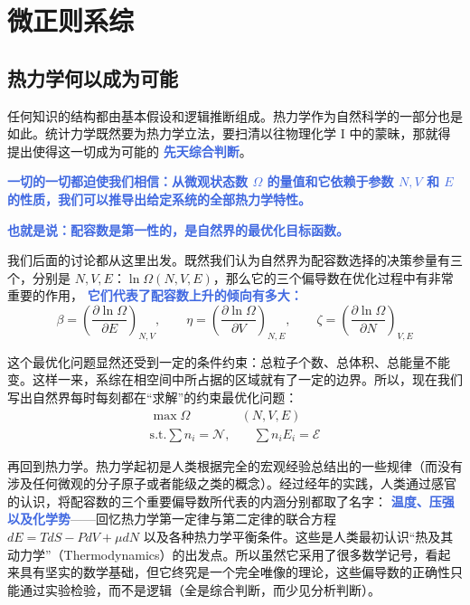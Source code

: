 \section{微正则系综}\label{sec:微正则系综}

\subsection{热力学何以成为可能}

任何知识的结构都由基本假设和逻辑推断组成。热力学作为自然科学的一部分也是如此。统计力学既然要为热力学立法，要扫清以往物理化学 I 中的蒙昧，那就得提出使得这一切成为可能的 \textcolor{RoyalBlue}{\textbf{\kaishu 先天综合判断}}。

\textcolor{RoyalBlue}{\textbf{\kaishu 一切的一切都迫使我们相信：从微观状态数 $\Omega$ 的量值和它依赖于参数 $N,V$ 和 $E$ 的性质，我们可以推导出给定系统的全部热力学特性。}}

\textcolor{RoyalBlue}{\textbf{\kaishu 也就是说：配容数是第一性的，是自然界的最优化目标函数。}}

我们后面的讨论都从这里出发。既然我们认为自然界为配容数选择的决策参量有三个，分别是 $N,V,E$：$\ln\Omega(N,V,E)$，那么它的三个偏导数在优化过程中有非常重要的作用， \textcolor{RoyalBlue}{\textbf{\kaishu 它们代表了配容数上升的倾向有多大：}} 
\begin{equation}
    \beta = \left(\frac{\partial \ln\Omega}{\partial E}\right)_{N,V},\quad\quad \eta = \left(\frac{\partial \ln\Omega}{\partial V}\right)_{N,E},\quad\quad \zeta = \left(\frac{\partial \ln\Omega}{\partial N}\right)_{V,E}
\end{equation}

这个最优化问题显然还受到一定的条件约束：总粒子个数、总体积、总能量不能变。这样一来，系综在相空间中所占据的区域就有了一定的边界。所以，现在我们写出自然界每时每刻都在“求解”的约束最优化问题：
\begin{equation}\label{equ:optimizeI}
    \begin{split}
        \max \Omega&(N,V,E)\\
        \text{s.t.}\sum n_i = \mathcal{N},&\quad\sum n_iE_i = \mathcal{E}
    \end{split}
\end{equation}

再回到热力学。热力学起初是人类根据完全的宏观经验总结出的一些规律（而没有涉及任何微观的分子原子或者能级之类的概念）。经过经年的实践，人类通过感官的认识，将配容数的三个重要偏导数所代表的内涵分别都取了名字： \textcolor{RoyalBlue}{\textbf{\kaishu 温度、压强以及化学势}}——回忆热力学第一定律与第二定律的联合方程 $dE = TdS - PdV+ \mu dN$ 以及各种热力学平衡条件。这些是人类最初认识“热及其动力学”（Thermodynamics）的出发点。所以虽然它采用了很多数学记号，看起来具有坚实的数学基础，但它终究是一个完全唯像的理论，这些偏导数的正确性只能通过实验检验，而不是逻辑（全是综合判断，而少见分析判断）。

